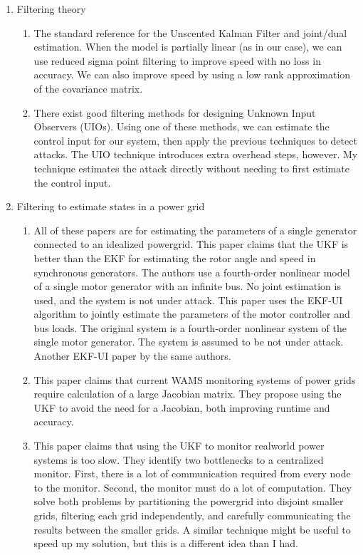 \documentclass{article}
\begin{document}
\begin{enumerate}
\item
Filtering theory
\begin{enumerate}
\item
The standard reference for the Unscented Kalman Filter and joint/dual estimation. \cite{wan2000unscented}
When the model is partially linear (as in our case), we can use reduced sigma point filtering to improve speed with no loss in accuracy.
\cite{morelande2006reduced}
We can also improve speed by using a low rank approximation of the covariance matrix.
\cite{padilla2010adaptive}

\item
There exist good filtering methods for designing Unknown Input Observers (UIOs).
\cite{yang1988observers,bolandhemmat2012solution,witczak2014unknown}
Using one of these methods, we can estimate the control input for our system,
then apply the previous techniques to detect attacks.
The UIO technique introduces extra overhead steps, however.
My technique estimates the attack directly without needing to first estimate the control input.
\end{enumerate}

\item
Filtering to estimate states in a power grid
\begin{enumerate}
\item
All of these papers are for estimating the parameters of a single generator connected to an idealized powergrid.
This paper claims that the UKF is better than the EKF for estimating the rotor angle and speed in synchronous generators.
The authors use a fourth-order nonlinear model of a single motor generator with an infinite bus.
No joint estimation is used, and the system is not under attack.
\cite{ghahremani2011online}
This paper uses the EKF-UI algorithm to jointly estimate the parameters of the motor controller and bus loads.
The original system is a fourth-order nonlinear system of the single motor generator.
The system is assumed to be not under attack.
\cite{ghahremani2011dynamic}
Another EKF-UI paper by the same authors.
\cite{ghahremani2016local}

\item
This paper claims that current WAMS monitoring systems of power grids require calculation of a large Jacobian matrix.
They propose using the UKF to avoid the need for a Jacobian, both improving runtime and accuracy.
\cite{wang2012alternative}

\item
This paper claims that using the UKF to monitor realworld power systems is too slow.
They identify two bottlenecks to a centralized monitor.
First, there is a lot of communication required from every node to the monitor.
Second, the monitor must do a lot of computation.
They solve both problems by partitioning the powergrid into disjoint smaller grids,
filtering each grid independently,
and carefully communicating the results between the smaller grids.
A similar technique might be useful to speed up my solution,
but this is a different idea than I had.
\cite{qing2015decentralized}


\end{enumerate}
\end{enumerate}
\end{document}
